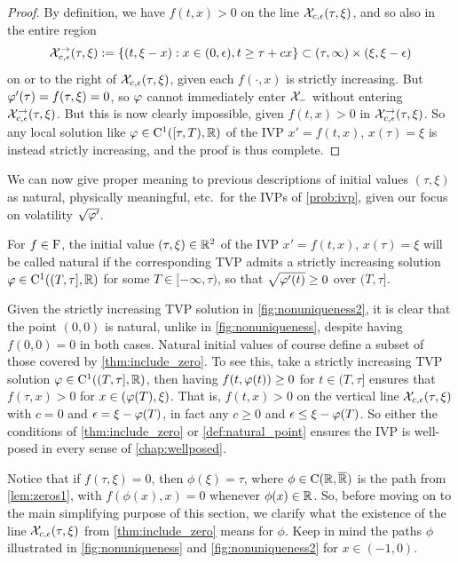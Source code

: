 \begin{proof}
    By definition, we have $f(t,x)>0$ on the line $\mathcal{X}_{c,\epsilon}(\tau,\xi)$, and so also in the entire region
    \begin{equation}
        \mathcal{X}_{c,\epsilon}^\to(\tau,\xi):=\{(t,\xi-x):x\in(0,\epsilon), t\ge\tau+cx\}\subset (\tau,\infty)\times(\xi,\xi-\epsilon)
    \end{equation}
    on or to the right of $\mathcal{X}_{c,\epsilon}(\tau,\xi)$, given each $f(\cdot,x)$ is strictly increasing. But $\varphi'(\tau)=f(\tau,\xi)=0$, so $\varphi$ cannot immediately enter $\mathcal{X}_-$ without entering $\mathcal{X}_{c,\epsilon}^\to(\tau,\xi)$. But this is now clearly impossible, given $f(t,x)>0$ in $\mathcal{X}_{c,\epsilon}^\to(\tau,\xi)$. So any local solution like $\varphi\in\mathrm{C}^1([\tau,T),\mathbb{R})$ of the IVP $x'=f(t,x)$, $x(\tau)=\xi$ is instead strictly increasing, and the proof is thus complete.
\end{proof}

We can now give proper meaning to previous descriptions of initial values $(\tau,\xi)$ as natural, physically meaningful, etc.~for the IVPs of \autoref{prob:ivp}, given our focus on volatility $\sqrt{\varphi'}$.

\begin{definition}\label{def:natural_point}
    For $f\in\mathrm{F}$, the initial value $(\tau,\xi)\in\mathbb{R}^2$ of the IVP $x'=f(t,x)$, $x(\tau)=\xi$ will be called natural if the corresponding TVP admits a strictly increasing solution $\varphi\in\mathrm{C}^1((T,\tau],\mathbb{R})$ for some $T\in[-\infty,\tau)$, so that $\sqrt{\varphi'(t)}\ge0$ over $(T,\tau]$.
\end{definition}

Given the strictly increasing TVP solution in \autoref{fig:nonuniqueness2}, it is clear that the point $(0,0)$ is natural, unlike in \autoref{fig:nonuniqueness}, despite having $f(0,0)=0$ in both cases. Natural initial values of course define a subset of those covered by \autoref{thm:include_zero}. To see this, take a strictly increasing TVP solution $\varphi\in\mathrm{C}^1((T,\tau],\mathbb{R})$, then having $f(t,\varphi(t))\ge0$ for $t\in(T,\tau]$ ensures that $f(\tau,x)>0$ for $x\in(\varphi(T),\xi)$. That is, $f(t,x)>0$ on the vertical line $\mathcal{X}_{c,\epsilon}(\tau,\xi)$ with $c=0$ and $\epsilon=\xi-\varphi(T)$, in fact any $c\ge0$ and $\epsilon\le \xi-\varphi(T)$. So either the conditions of \autoref{thm:include_zero} or \autoref{def:natural_point} ensures the IVP is well-posed in every sense of \autoref{chap:wellposed}.

Notice that if $f(\tau,\xi)=0$, then $\phi(\xi)=\tau$, where $\phi\in\mathrm{C}(\mathbb{R},{\overline{\mathbb{R}}})$ is the path from \autoref{lem:zeros1}, with $f(\phi(x),x)=0$ whenever $\phi(x)\in\mathbb{R}$. So, before moving on to the main simplifying purpose of this section, we clarify what the existence of the line $\mathcal{X}_{c,\epsilon}(\tau,\xi)$ from \autoref{thm:include_zero} means for $\phi$. Keep in mind the paths $\phi$ illustrated in \autoref{fig:nonuniqueness} and \autoref{fig:nonuniqueness2} for $x\in(-1,0)$.

